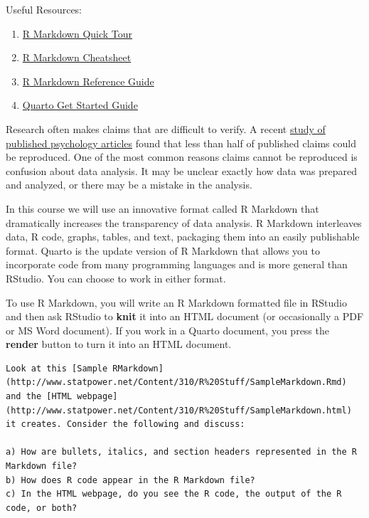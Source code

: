 \documentclass[
  letterpaper,
  DIV=11,
  numbers=noendperiod]{scrreprt}
\providecommand{\tightlist}{%
  \setlength{\itemsep}{0pt}\setlength{\parskip}{0pt}}\usepackage{longtable,booktabs,array}
\begin{document}
Useful Resources:

\begin{enumerate}
\def\labelenumi{\arabic{enumi}.}
\tightlist
\item
  \href{http://rmarkdown.rstudio.com/authoring_quick_tour.html}{R
  Markdown Quick Tour}\\
\item
  \href{https://github.com/rstudio/cheatsheets/raw/main/rmarkdown-2.0.pdf}{R
  Markdown Cheatsheet}
\item
  \href{https://www.rstudio.com/wp-content/uploads/2015/03/rmarkdown-reference.pdf}{R
  Markdown Reference Guide}
\item
  \href{https://quarto.org/docs/get-started/hello/rstudio.html}{Quarto
  Get Started Guide}
\end{enumerate}

Research often makes claims that are difficult to verify. A recent
\href{http://science.sciencemag.org/content/349/6251/aac4716}{study of
published psychology articles} found that less than half of published
claims could be reproduced. One of the most common reasons claims cannot
be reproduced is confusion about data analysis. It may be unclear
exactly how data was prepared and analyzed, or there may be a mistake in
the analysis.

In this course we will use an innovative format called R Markdown that
dramatically increases the transparency of data analysis. R Markdown
interleaves data, R code, graphs, tables, and text, packaging them into
an easily publishable format. Quarto is the update version of R Markdown
that allows you to incorporate code from many programming languages and
is more general than RStudio. You can choose to work in either format.

To use R Markdown, you will write an R Markdown formatted file in
RStudio and then ask RStudio to \textbf{knit} it into an HTML document
(or occasionally a PDF or MS Word document). If you work in a Quarto
document, you press the \textbf{render} button to turn it into an HTML
document.

\begin{verbatim}
Look at this [Sample RMarkdown](http://www.statpower.net/Content/310/R%20Stuff/SampleMarkdown.Rmd) and the [HTML webpage](http://www.statpower.net/Content/310/R%20Stuff/SampleMarkdown.html) it creates. Consider the following and discuss:
    
a) How are bullets, italics, and section headers represented in the R Markdown file?
b) How does R code appear in the R Markdown file?
c) In the HTML webpage, do you see the R code, the output of the R code, or both?
\end{verbatim}
\end{document}
